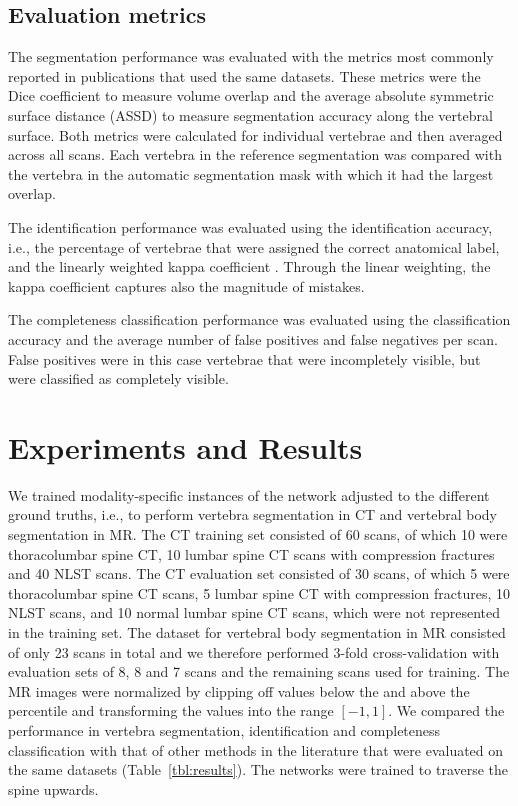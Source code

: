 \documentclass[authoryear,5p,final,times]{elsarticle}
\begin{document}
    \subsection{Evaluation metrics}

    The segmentation performance was evaluated with the metrics most commonly reported in publications that used the same datasets. These metrics were the Dice coefficient to measure volume overlap and the average absolute symmetric surface distance (ASSD) to measure segmentation accuracy along the vertebral surface. Both metrics were calculated for individual vertebrae and then averaged across all scans. Each vertebra in the reference segmentation was compared with the vertebra in the automatic segmentation mask with which it had the largest overlap.

    The identification performance was evaluated using the identification accuracy, i.e., the percentage of vertebrae that were assigned the correct anatomical label, and the linearly weighted kappa coefficient \citep{Cohen1968}. Through the linear weighting, the kappa coefficient captures also the magnitude of mistakes.

    The completeness classification performance was evaluated using the classification accuracy and the average number of false positives and false negatives per scan. False positives were in this case vertebrae that were incompletely visible, but were classified as completely visible.

    \section{Experiments and Results}

    We trained modality-specific instances of the network adjusted to the different ground truths, i.e., to perform vertebra segmentation in CT and vertebral body segmentation in MR. The CT training set consisted of 60 scans, of which 10 were thoracolumbar spine CT, 10 lumbar spine CT scans with compression fractures and 40 NLST scans. The CT evaluation set consisted of 30 scans, of which 5 were thoracolumbar spine CT scans, 5 lumbar spine CT with compression fractures, 10 NLST scans, and 10 normal lumbar spine CT scans, which were not represented in the training set. The dataset for vertebral body segmentation in MR consisted of only 23 scans in total and we therefore performed 3-fold cross-validation with evaluation sets of 8, 8 and 7 scans and the remaining scans used for training. The MR images were normalized by clipping off values below the  and above the  percentile and transforming the values into the range $[-1,1]$. We compared the performance in vertebra segmentation, identification and completeness classification with that of other methods in the literature that were evaluated on the same datasets (Table~\ref*{tbl:results}). The networks were trained to traverse the spine upwards.
\end{document}

